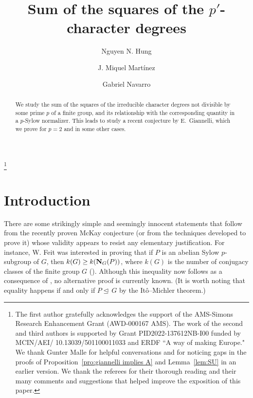 \documentclass[12pt]{amsart}
\theoremstyle{plain}
\theoremstyle{definition}
\numberwithin{equation}{section}
\def\nor{\trianglelefteq\,}
\def\norm#1#2{{\bf N}_{#1}(#2)}
\begin{document}
\title{Sum of the squares of the $p'$-character degrees}

\author[Nguyen N. Hung]{Nguyen N. Hung}
\address[Nguyen N. Hung]{Department of Mathematics, The University of Akron, Akron,
OH 44325, USA}

\author[J. Miquel Mart\'inez]{J. Miquel Mart\'inez}
\address[J. Miquel Mart\'inez]{Departament de Matem\`atiques, Universitat de Val\`encia, 46100 Burjassot,
Val\`encia, Spain}


\author[Gabriel Navarro]{Gabriel Navarro}
\address[Gabriel Navarro]{Departament de Matem\`atiques, Universitat de Val\`encia, 46100 Burjassot,
Val\`encia, Spain}

\thanks{The first author gratefully acknowledges the support of the AMS-Simons Research Enhancement
Grant (AWD-000167 AMS). The work of the second and third authors is
supported by Grant PID2022-137612NB-I00 funded by MCIN/AEI/
10.13039/501100011033 and ERDF ``A way of making Europe." We thank
Gunter Malle for helpful conversations and for noticing gaps in the
proofs of Proposition~\ref{pro:giannelli implies A} and
Lemma~\ref{lem:SU} in an earlier version. We thank the referees for their thorough reading and their many comments and suggestions that helped improve the exposition of this paper.}


\keywords{}


\begin{abstract}
We study the sum of the squares of the irreducible character degrees
not divisible by some prime $p$ of a finite group, and its
relationship with the corresponding quantity in a $p$-Sylow
normalizer. This leads to study a recent conjecture by E.~Giannelli,
which we prove for $p=2$ and in some other cases.
\end{abstract}


\maketitle


\section{Introduction}
There are some strikingly simple and seemingly innocent statements
that follow from the recently proven McKay conjecture \cite{CS} (or
from the techniques developed to prove it) whose validity appears to
resist  any elementary justification. For instance, W. Feit was
interested in proving that if $P$ is an abelian Sylow $p$-subgroup
of $G$, then $k(G)\ge k(\norm GP)$, where $k(G)$ is the number of
conjugacy classes of the finite group $G$ (\cite{F}). Although this
inequality now follows as a consequence of \cite{CS},  no
alternative proof is currently known. (It is worth noting that
equality happens if and only if $P\nor G$ by the It\^o--Michler
theorem.)
\end{document}
